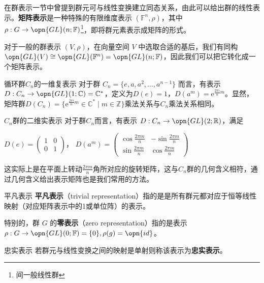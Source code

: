

在群表示一节中曾提到群元可与线性变换建立同态关系，由此可以给出群的线性表示。\textbf{矩阵表示}是一种特殊的有限维度表示 $(\mathbb{F}^n, \rho)$，其中 $\rho: G \to \opn{GL}(n; \mathbb{F})$\footnote{间一般线性群}，即将群元素表示成矩阵的形式。

对于一般的群表示 $(V, \rho)$，在向量空间 $V$ 中选取合适的基后，我们有同构 $\opn{GL}(V) \cong \opn{GL}(\mathbb{F}^n) = \opn{GL}(n; \mathbb{F})$，因此我们可以把它转化成一个矩阵表示。

\begin{example}{循环群$C_n$的一维复表示}\label{gprep_ex1}
对于群 $C_n = \{e, a, a^2, \dots, a^{n - 1}\}$ 而言，有表示 $D: C_n \to \opn{GL}(1; \mathbb{C}) = \mathbb{C}^*$，定义为$D(e)=1$，$D(a^m) = \mathrm{e}^{\frac{2\pi i}{n}m}$。显然，矩阵群$D(C_n) = \{\mathrm{e}^{\frac{2\pi i}{n}m} \in \mathbb{C}^* \mid m \in \mathbb{Z}\}$乘法关系与$C_n$乘法关系相同。
\end{example}

\begin{example}{$C_n$群的二维实表示}\label{gprep_ex2}
对于群$C_n$而言，有表示 $D: C_n \to \opn{GL}(2; \mathbb{R})$，满足

$D(e)=\begin{pmatrix}
 1 & 0 \\
 0 & 1
\end{pmatrix}$，
$D(a^m)=\begin{pmatrix}
 \cos{\frac{2\pi m}{n}} & -\sin{\frac{2\pi m}{n}}\\
 \sin{\frac{2\pi m}{n}} &\cos{\frac{2\pi m}{n}}
\end{pmatrix}$

这实际上是在平面上转动$\frac{2\pi m}{n}$角所对应的旋转矩阵，这与$C_n$群的几何含义相符，通过几何含义给出表示矩阵也是我们常用的方法。
\end{example}

\begin{definition}{平凡表示}
\textbf{平凡表示}（trivial representation）指的是是所有群元都对应于恒等线性映射（对应矩阵表示中的1或单位阵）的表示。

特别的，群 $G$ 的\textbf{零表示}（zero representation）指的是表示 $\rho: G \to \opn{GL}(0; \mathbb{F}) = \{0\}, \rho(g) = \opn{id}$。
\end{definition}

\begin{definition}{忠实表示}
若群元与线性变换之间的映射是单射则称该表示为\textbf{忠实表示}。
\end{definition}


